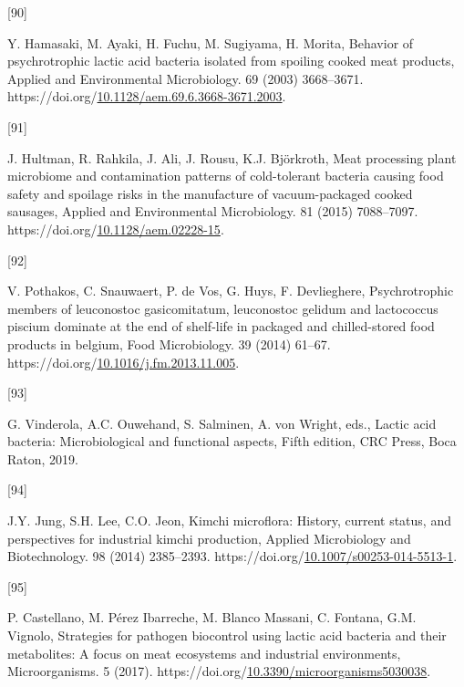 \documentclass[preprint,3p,
a4paper]{elsarticle} %
\newlength{\cslhangindent}
\newlength{\csllabelwidth}
\newlength{\cslentryspacingunit} %
\newenvironment{CSLReferences}[2] %
 {%
  \setlength{\parindent}{0pt}
  \ifodd #1
  \let\oldpar\par
  \def\par{\hangindent=\cslhangindent\oldpar}
  \fi
  \setlength{\parskip}{#2\cslentryspacingunit}
 }%
 {}
\newcommand{\CSLLeftMargin}[1]{\parbox[t]{\csllabelwidth}{#1}}
\newcommand{\CSLRightInline}[1]{\parbox[t]{\linewidth - \csllabelwidth}{#1}\break}
\begin{document}
\begin{CSLReferences}{0}{0}
\leavevmode{}%
\CSLLeftMargin{{[}90{]} }%
\CSLRightInline{Y. Hamasaki, M. Ayaki, H. Fuchu, M. Sugiyama, H. Morita,
Behavior of psychrotrophic lactic acid bacteria isolated from spoiling
cooked meat products, Applied and Environmental Microbiology. 69 (2003)
3668--3671.
https://doi.org/\href{https://doi.org/10.1128/aem.69.6.3668-3671.2003}{10.1128/aem.69.6.3668-3671.2003}.}

\leavevmode{}%
\CSLLeftMargin{{[}91{]} }%
\CSLRightInline{J. Hultman, R. Rahkila, J. Ali, J. Rousu, K.J.
Björkroth, Meat processing plant microbiome and contamination patterns
of cold-tolerant bacteria causing food safety and spoilage risks in the
manufacture of vacuum-packaged cooked sausages, Applied and
Environmental Microbiology. 81 (2015) 7088--7097.
https://doi.org/\href{https://doi.org/10.1128/aem.02228-15}{10.1128/aem.02228-15}.}

\leavevmode{}%
\CSLLeftMargin{{[}92{]} }%
\CSLRightInline{V. Pothakos, C. Snauwaert, P. de Vos, G. Huys, F.
Devlieghere, Psychrotrophic members of leuconostoc gasicomitatum,
leuconostoc gelidum and lactococcus piscium dominate at the end of
shelf-life in packaged and chilled-stored food products in belgium, Food
Microbiology. 39 (2014) 61--67.
https://doi.org/\href{https://doi.org/10.1016/j.fm.2013.11.005}{10.1016/j.fm.2013.11.005}.}

\leavevmode{}%
\CSLLeftMargin{{[}93{]} }%
\CSLRightInline{G. Vinderola, A.C. Ouwehand, S. Salminen, A. von Wright,
eds., Lactic acid bacteria: Microbiological and functional aspects,
Fifth edition, {CRC Press}, Boca Raton, 2019.}

\leavevmode{}%
\CSLLeftMargin{{[}94{]} }%
\CSLRightInline{J.Y. Jung, S.H. Lee, C.O. Jeon, Kimchi microflora:
History, current status, and perspectives for industrial kimchi
production, Applied Microbiology and Biotechnology. 98 (2014)
2385--2393.
https://doi.org/\href{https://doi.org/10.1007/s00253-014-5513-1}{10.1007/s00253-014-5513-1}.}

\leavevmode{}%
\CSLLeftMargin{{[}95{]} }%
\CSLRightInline{P. Castellano, M. Pérez Ibarreche, M. Blanco Massani, C.
Fontana, G.M. Vignolo, Strategies for pathogen biocontrol using lactic
acid bacteria and their metabolites: A focus on meat ecosystems and
industrial environments, Microorganisms. 5 (2017).
https://doi.org/\href{https://doi.org/10.3390/microorganisms5030038}{10.3390/microorganisms5030038}.}


\end{CSLReferences}
\end{document}
